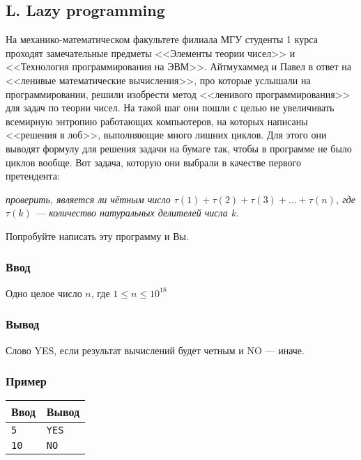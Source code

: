 \documentclass[10pt, a4paper]{article}
\newcommand{\informat}[1]
{
	\subsubsection*{Ввод} #1
}
\newcommand{\outformat}[1]
{
	\subsubsection*{Вывод} #1
}
\newcommand{\examplee}[4]
{
	\subsubsection*{Пример}
	\noindent
	\begin{center}
	\begin{tabularx}{\linewidth}{|X|X|}
	\hline
	Ввод 	& Вывод  	\\
	\hline
	{\tt #1} & {\tt #2}	\\
	\hline
	{\tt #3} & {\tt #4}	\\
	\hline
	\end{tabularx}
	\end{center}
}
\begin{document}
\subsection*{L. Lazy programming}

На механико-математическом факультете филиала МГУ студенты 1 курса проходят замечательные предметы <<Элементы теории чисел>> и <<Технология программирования на ЭВМ>>. Айтмухаммед и Павел в ответ на <<ленивые математические вычисления>>, про которые услышали на программировании, решили изобрести метод <<ленивого программирования>> для задач по теории чисел. На такой шаг они пошли с целью не увеличивать всемирную энтропию работающих компьютеров, на которых написаны <<решения в лоб>>, выполняющие много лишних циклов. Для этого они выводят формулу для решения задачи на бумаге так, чтобы в программе не было циклов вообще. Вот задача, которую они выбрали в качестве первого претендента:

\textit{проверить, является ли чётным число $\tau(1) + \tau(2) + \tau(3) + ... + \tau(n)$, \newline где $\tau(k)$ --- количество натуральных делителей числа k.}

Попробуйте написать эту программу и Вы. 

\informat{Одно целое число $n$, где $1 \le n \le 10^{18}$}

\outformat{Слово YES, если результат вычислений будет четным и NO --- иначе.}

\examplee{5}{YES}{10}{NO}
\end{document}
